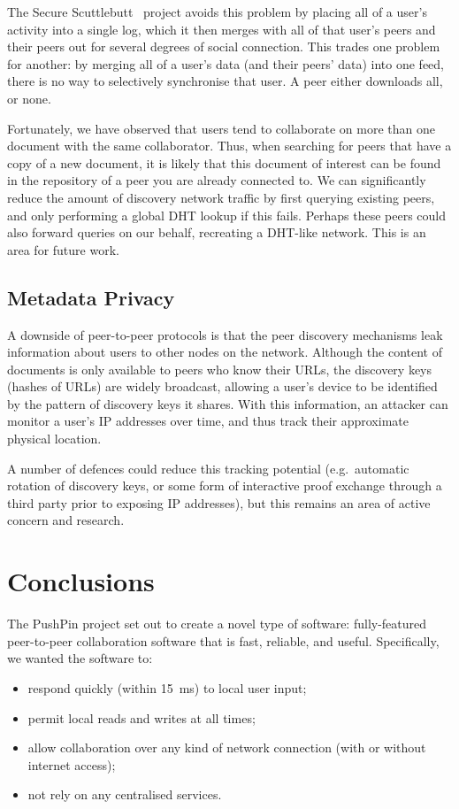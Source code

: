 \documentclass[sigplan,10pt]{acmart}
\begin{document}
The Secure Scuttlebutt~\cite{Tarr:2019ba} project avoids this problem by placing all of a user's activity into a single log, which it then merges with all of that user's peers and their peers out for several degrees of social connection. This trades one problem for another: by merging all of a user's data (and their peers' data) into one feed, there is no way to selectively synchronise that user. A peer either downloads all, or none.

Fortunately, we have observed that users tend to collaborate on more than one document with the same collaborator.
Thus, when searching for peers that have a copy of a new document, it is likely that this document of interest can be found in the repository of a peer you are already connected to.
We can significantly reduce the amount of discovery network traffic by first querying existing peers, and only performing a global DHT lookup if this fails.
Perhaps these peers could also forward queries on our behalf, recreating a DHT-like network.
This is an area for future work.

\subsection{Metadata Privacy}

A downside of peer-to-peer protocols is that the peer discovery mechanisms leak information about users to other nodes on the network.
Although the content of documents is only available to peers who know their URLs, the discovery keys (hashes of URLs) are widely broadcast, allowing a user's device to be identified by the pattern of discovery keys it shares. With this information, an attacker can monitor a user's IP addresses over time, and thus track their approximate physical location.

A number of defences could reduce this tracking potential (e.g.\ automatic rotation of discovery keys, or some form of interactive proof exchange through a third party prior to exposing IP addresses), but this remains an area of active concern and research.

\section{Conclusions}

The PushPin project set out to create a novel type of software: fully-featured peer-to-peer collaboration software that is fast, reliable, and useful. Specifically, we wanted the software to:
\begin{itemize}
    \item respond quickly (within 15~ms) to local user input;
    \item permit local reads and writes at all times;
    \item allow collaboration over any kind of network connection (with or without internet access);
    \item not rely on any centralised services.
\end{itemize}
\end{document}

